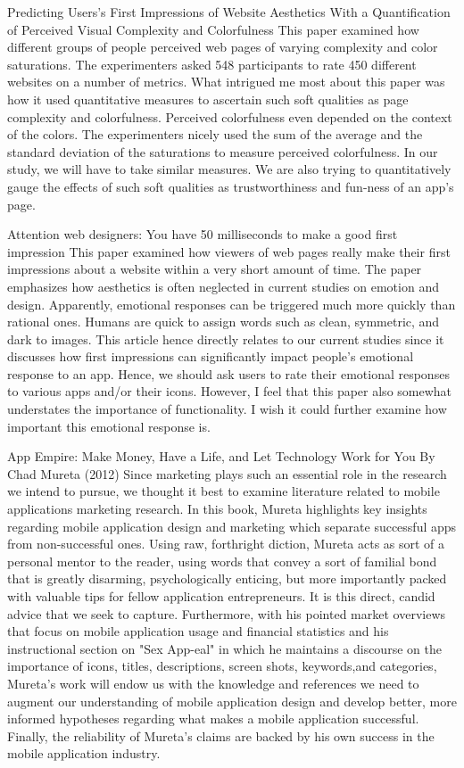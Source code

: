 Predicting Users's First Impressions of Website Aesthetics With a Quantiﬁcation of Perceived Visual Complexity and Colorfulness
This paper examined how different groups of people perceived web pages of varying complexity and color saturations. The experimenters asked 548 participants to rate 450 different websites on a number of metrics. What intrigued me most about this paper was how it used quantitative measures to ascertain such soft qualities as page complexity and colorfulness. Perceived colorfulness even depended on the context of the colors. The experimenters nicely used the sum of the average and the standard deviation of the saturations to measure perceived colorfulness.
In our study, we will have to take similar measures. We are also trying to quantitatively gauge the effects of such soft qualities as trustworthiness and fun-ness of an app's page.

Attention web designers: You have 50 milliseconds to make a good first impression
This paper examined how viewers of web pages really make their first impressions about a website within a very short amount of time. The paper emphasizes how aesthetics is often neglected in current studies on emotion and design. Apparently, emotional responses can be triggered much more quickly than rational ones. Humans are quick to assign words such as clean, symmetric, and dark to images. This article hence directly relates to our current studies since it discusses how first impressions can significantly impact people's emotional response to an app. Hence, we should ask users to rate their emotional responses to various apps and/or their icons. However, I feel that this paper also somewhat understates the importance of functionality. I wish it could further examine how important this emotional response is.~\cite{tohidi06:getting}

App Empire: Make Money, Have a Life, and Let Technology Work for You
By Chad Mureta (2012)
Since marketing plays such an essential role in the research we intend to pursue, we thought it best to examine literature related to mobile applications marketing research. In this book, Mureta highlights key insights regarding mobile application design and marketing which separate successful apps from non-successful ones.  Using raw, forthright diction, Mureta acts as sort of a personal mentor to the reader, using words that convey a sort of familial bond that is greatly disarming, psychologically enticing, but more importantly packed with valuable tips for fellow application entrepreneurs.  It is this direct, candid advice that we seek to capture.  Furthermore, with his pointed market overviews that focus on mobile application usage and financial statistics and his instructional section on "Sex App-eal" in which he maintains a discourse on the importance of icons, titles, descriptions, screen shots, keywords,and categories, Mureta's work will endow us with the knowledge and references we need to augment our understanding of mobile application design and develop better, more informed hypotheses regarding what makes a mobile application successful. Finally, the reliability of Mureta's claims are backed by his own success in the mobile application industry.~\cite{mureta12:app}

